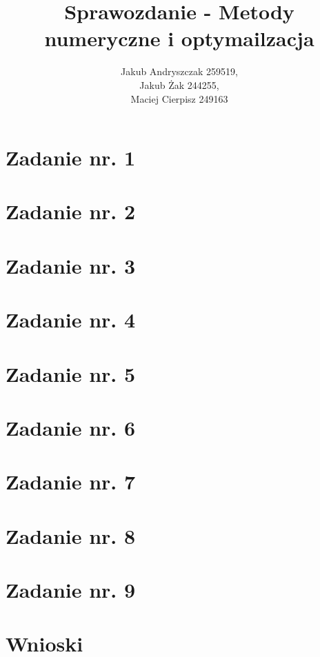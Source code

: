 \documentclass{article}
\begin{document}
\title{Sprawozdanie - Metody numeryczne i optymailzacja}
\author{Jakub Andryszczak 259519,\\ Jakub Żak 244255,\\ Maciej Cierpisz 249163}
\date{}
\maketitle

\newpage
\tableofcontents

\newpage
\section{Zadanie nr. 1}

\section{Zadanie nr. 2}


\section{Zadanie nr. 3}

\section{Zadanie nr. 4}

\section{Zadanie nr. 5}


\section{Zadanie nr. 6}


\section{Zadanie nr. 7}

\section{Zadanie nr. 8}



\section{Zadanie nr. 9}



\section{Wnioski}
\end{document}
